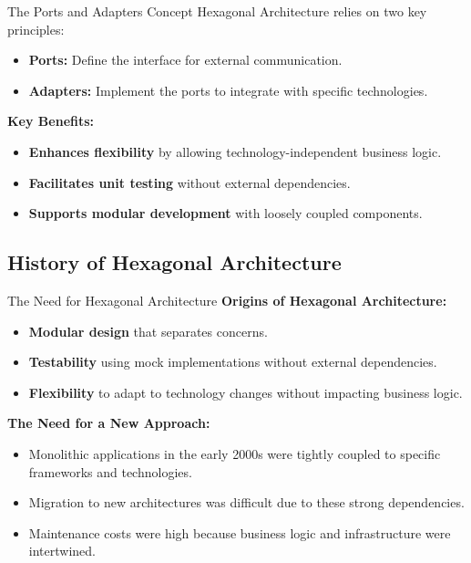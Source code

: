 \documentclass[aspectratio=169, table]{beamer}
\begin{document}
\begin{frame}[fragile]{The Ports and Adapters Concept}
	\vspace{20pt}
	Hexagonal Architecture relies on two key principles:
	\begin{itemize}
		\item \textbf{Ports:} Define the interface for external communication.
		\item \textbf{Adapters:} Implement the ports to integrate with specific technologies.
	\end{itemize}
	
	\textbf{Key Benefits:}
	\begin{itemize}
		\item \textbf{Enhances flexibility} by allowing technology-independent business logic.
		\item \textbf{Facilitates unit testing} without external dependencies.
		\item \textbf{Supports modular development} with loosely coupled components.
	\end{itemize}
\end{frame}

\subsection{History of Hexagonal Architecture}

\begin{frame}[fragile]{The Need for Hexagonal Architecture}
	\vspace{20pt}
	\textbf{Origins of Hexagonal Architecture:}
	\begin{itemize}
		\item \textbf{Modular design} that separates concerns.
		\item \textbf{Testability} using mock implementations without external dependencies.
		\item \textbf{Flexibility} to adapt to technology changes without impacting business logic.
	\end{itemize}
	
	\textbf{The Need for a New Approach:}
	\begin{itemize}
		\item Monolithic applications in the early 2000s were tightly coupled to specific frameworks and technologies.
		\item Migration to new architectures was difficult due to these strong dependencies.
		\item Maintenance costs were high because business logic and infrastructure were intertwined.
	\end{itemize}
\end{frame}
\end{document}
